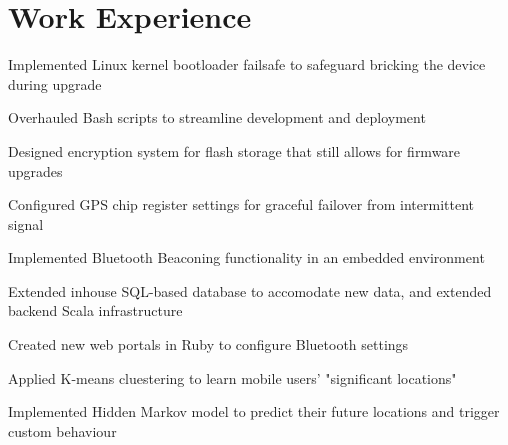 \documentclass[]{resume}
\begin{document}
\begin{minipage}[t]{0.66\textwidth} 


\section{Work Experience}

\vspace{\topsep} 
\begin{tightemize}
\item Implemented Linux kernel bootloader failsafe to safeguard bricking the device during upgrade
\item Overhauled Bash scripts to streamline development and deployment
\item Designed encryption system for flash storage that still allows for firmware upgrades
\item Configured GPS chip register settings for graceful failover from intermittent signal
\end{tightemize}
\sectionsep

\begin{tightemize}
\item Implemented Bluetooth Beaconing functionality in an embedded environment
\item Extended inhouse SQL-based database to accomodate new data, and extended backend Scala infrastructure
\item Created new web portals in Ruby to configure Bluetooth settings
\end{tightemize}
\sectionsep

\begin{tightemize}
\item Applied K-means cluestering to learn mobile users' "significant locations"
\item Implemented Hidden Markov model to predict their future locations and trigger custom behaviour
\end{tightemize}
\sectionsep




\end{minipage}
\end{document}
